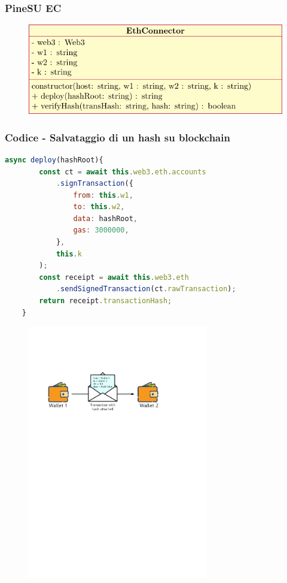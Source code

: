 \documentclass{beamer}
\begin{document}
\begin{frame}
	\frametitle{PineSU EC}
	\begin{figure}
		\includegraphics[width=\textwidth]{figures/umlec.pdf}
	\end{figure}
\end{frame}

\begin{frame}[fragile]
	\frametitle{Codice - Salvataggio di un hash su blockchain}
	\begin{lstlisting}[language=JavaScript, numbers=none]
	async deploy(hashRoot){
		const ct = await this.web3.eth.accounts
			.signTransaction({
				from: this.w1,
				to: this.w2,
				data: hashRoot,
				gas: 3000000,
			},
			this.k
		);
		const receipt = await this.web3.eth
			.sendSignedTransaction(ct.rawTransaction);
		return receipt.transactionHash;
	}
	\end{lstlisting}
	\vspace{-0.8cm}
	\begin{figure}
		\includegraphics[width=0.7\textwidth]{figures/wallets.pdf}
	\end{figure}
\end{frame}
\end{document}
